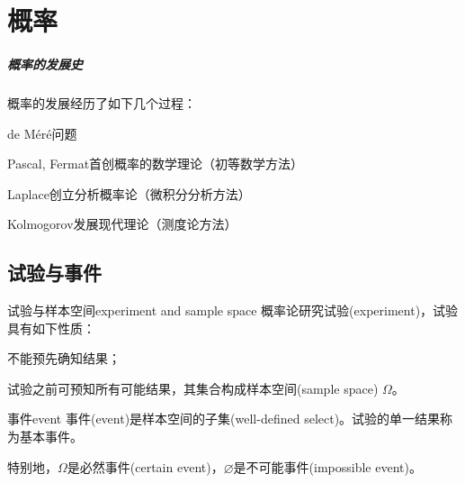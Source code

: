 	
\chapter{概率}

\paragraph{概率的发展史}

概率的发展经历了如下几个过程：

\begin{compactitem}
	\item de M\'er\'e问题
	\item Pascal, Fermat首创概率的数学理论（初等数学方法）
	\item Laplace创立分析概率论（微积分分析方法）
	\item Kolmogorov发展现代理论（测度论方法）
\end{compactitem}

\section{试验与事件}
\label{sec:experiment and event}

\begin{definition}{试验与样本空间}{experiment and sample space}
    概率论研究试验(experiment)，试验具有如下性质：
    \begin{compactenum}
		\item 不能预先确知结果；
		\item 试验之前可预知所有可能结果，其集合构成样本空间(sample space) $\Omega$。
    \end{compactenum}
\end{definition}

\begin{definition}{事件}{event}
    事件(event)是样本空间的子集(well-defined select)。试验的单一结果称为基本事件。

    特别地，$\Omega$是必然事件(certain event)，$\varnothing$是不可能事件(impossible event)。
\end{definition}

